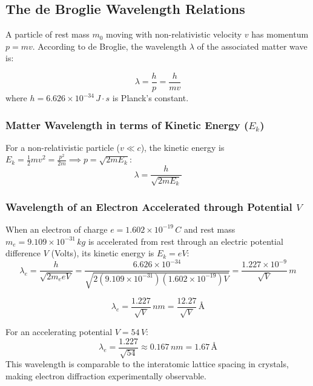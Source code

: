 \subsection{The de Broglie Wavelength Relations}
A particle of rest mass $m_0$ moving with non-relativistic velocity $v$ has momentum $p = m v$. According to de Broglie, the wavelength $\lambda$ of the associated matter wave is:

\begin{keyequation}
\begin{equation}
    \lambda = \frac{h}{p} = \frac{h}{m v}
\end{equation}
where $h = 6.626 \times 10^{-34}\,\si{J\cdot s}$ is Planck's constant.
\end{keyequation}

\subsubsection{Matter Wavelength in terms of Kinetic Energy (\texorpdfstring{$E_k$}{Ek})}
For a non-relativistic particle ($v \ll c$), the kinetic energy is $E_k = \frac{1}{2}m v^2 = \frac{p^2}{2m} \implies p = \sqrt{2m E_k}$:
\begin{equation}
    \lambda = \frac{h}{\sqrt{2m E_k}}
\end{equation}

\subsubsection{Wavelength of an Electron Accelerated through Potential \texorpdfstring{$V$}{V}}
When an electron of charge $e = 1.602 \times 10^{-19}\,\si{C}$ and rest mass $m_e = 9.109 \times 10^{-31}\,\si{kg}$ is accelerated from rest through an electric potential difference $V$ (Volts), its kinetic energy is $E_k = e V$:
\begin{equation}
    \lambda_e = \frac{h}{\sqrt{2 m_e e V}} = \frac{6.626 \times 10^{-34}}{\sqrt{2(9.109 \times 10^{-31})(1.602 \times 10^{-19})V}} = \frac{1.227 \times 10^{-9}}{\sqrt{V}}\,\si{m}
\end{equation}

\begin{keyequation}
\begin{equation}
    \lambda_e = \frac{1.227}{\sqrt{V}}\,\si{nm} = \frac{12.27}{\sqrt{V}}\,\si{\text{\AA}}
\end{equation}
\end{keyequation}
For an accelerating potential $V = 54\,\si{V}$:
\begin{equation}
    \lambda_e = \frac{1.227}{\sqrt{54}} \approx 0.167\,\si{nm} = 1.67\,\si{\text{\AA}}
\end{equation}
This wavelength is comparable to the interatomic lattice spacing in crystals, making electron diffraction experimentally observable.

